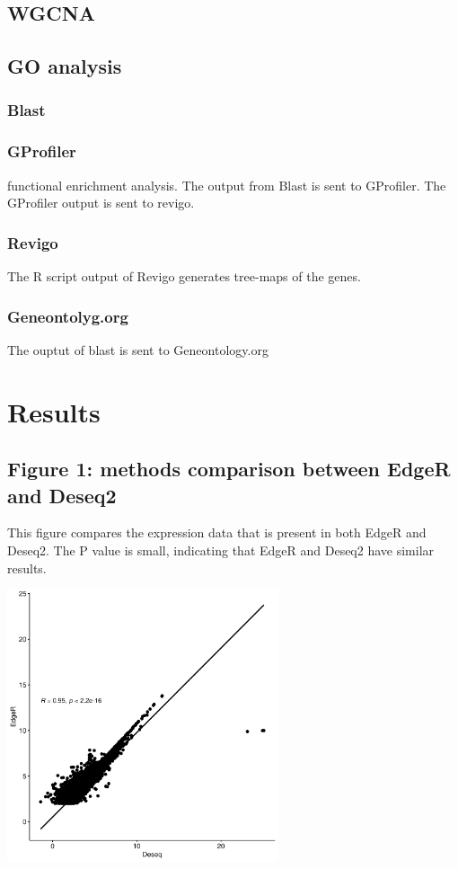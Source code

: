 \documentclass[11pt]{article}
\begin{document}
\subsection{WGCNA}
\label{sec:orgc01e2c7}
\subsection{GO analysis}
\label{sec:org57e0974}
\subsubsection{Blast}
\label{sec:org23bbd76}

\subsubsection{GProfiler}
\label{sec:org0591d33}
functional enrichment analysis. The output from Blast is sent to GProfiler. The GProfiler output is sent to revigo.
\subsubsection{Revigo}
\label{sec:orgf961e1d}
The R script output of Revigo generates tree-maps of the genes.
\subsubsection{Geneontolyg.org}
\label{sec:org1318598}
The ouptut of blast is sent to Geneontology.org
\section{Results}
\label{sec:orged1e4f7}
\subsection{Figure 1: methods comparison between EdgeR and Deseq2}
\label{sec:org94490e8}
This figure compares the expression data that is present in both EdgeR and Deseq2. The P value is small, indicating that EdgeR and Deseq2 have similar results.
\begin{center}
\includegraphics[width=0.6\textwidth]{figure1/pearson.png}
\end{center}
\end{document}
